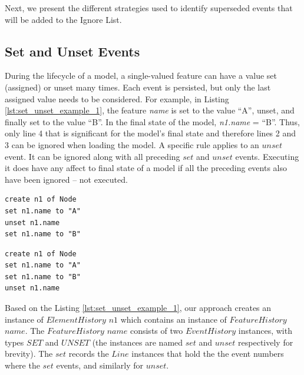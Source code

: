 \documentclass{llncs}
\begin{document}
    Next, we present the different strategies used to identify superseded events that will be added to the Ignore List.   
    
    \vspace{-10pt}
    \subsection{Set and Unset Events}
    \label{subsec:set_and_unset_operations}
    During the lifecycle of a model, a single-valued feature can have a value set (assigned) or unset many times. Each event is persisted, but only the last assigned value needs to be considered. For example, in Listing \ref{lst:set_unset_example_1}, the feature \emph{name} is set to the value ``A'', unset, and finally set to the value ``B''.  In the final state of the model, \emph{n1.name} = ``B''. Thus, only line 4 that is significant for the model's final state and therefore lines 2 and 3 can be ignored when loading the model. A specific rule applies to an $unset$ event. It can be ignored along with all preceding $set$ and $unset$ events. Executing it does have any affect to final state of a model if all the preceding events also have been ignored -- not executed.
    
    \vspace{-10pt}
    \begin{minipage}[t]{0.49\linewidth}
\begin{lstlisting}[style=eol,caption={A CBP representation of attribute \emph{name} assignments.},label=lst:set_unset_example_1]
create n1 of Node
set n1.name to "A"
unset n1.name
set n1.name to "B"
\end{lstlisting}
    \end{minipage}
    \hfill
    \begin{minipage}[t]{0.49\linewidth}
\begin{lstlisting}[style=eol,caption={A CBP representation of attribute \emph{name} assignments.},label=lst:set_unset_example_2]
create n1 of Node
set n1.name to "A"
set n1.name to "B"
unset n1.name
\end{lstlisting}
    \end{minipage}
    
    Based on the Listing \ref{lst:set_unset_example_1}, our approach creates an instance of $ElementHistory$ $n1$ which contains an instance of $FeatureHistory$ $name$. The $FeatureHistory$ $name$ consists of two $EventHistory$ instances, with types $SET$ and $UNSET$ (the instances are named $set$ and $unset$ respectively for brevity). The $set$ records the $Line$ instances that hold the the event numbers where the $set$ events, and similarly for $unset$.
    
\end{document}
